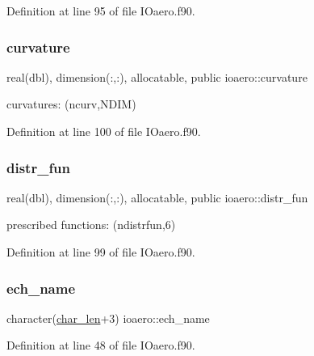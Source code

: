 Definition at line 95 of file I\+Oaero.\+f90.

\mbox{\label{namespaceioaero_ab2bc17b64328528015d161cab6490b80}} 
\subsubsection{\texorpdfstring{curvature}{curvature}}
{\footnotesize\ttfamily real(dbl), dimension(\+:,\+:), allocatable, public ioaero\+::curvature}



curvatures\+: (ncurv,N\+D\+IM) 



Definition at line 100 of file I\+Oaero.\+f90.

\mbox{\label{namespaceioaero_a1d7c3689e30c2925cd403a84e9176242}} 
\subsubsection{\texorpdfstring{distr\+\_\+fun}{distr\_fun}}
{\footnotesize\ttfamily real(dbl), dimension(\+:,\+:), allocatable, public ioaero\+::distr\+\_\+fun}



prescribed functions\+: (ndistrfun,6) 



Definition at line 99 of file I\+Oaero.\+f90.

\mbox{\label{namespaceioaero_a175dde142a22987a0e59b9738444d2e3}} 
\subsubsection{\texorpdfstring{ech\+\_\+name}{ech\_name}}
{\footnotesize\ttfamily character(\hyperlink{namespaceioaero_acd6bdfdcfd986fd1c26261e5996e3b03}{char\+\_\+len}+3) ioaero\+::ech\+\_\+name\hspace{0.3cm}{\ttfamily [private]}}



Definition at line 48 of file I\+Oaero.\+f90.

\mbox{\label{namespaceioaero_ae043619051217506f070ece6f24deedf}} 
